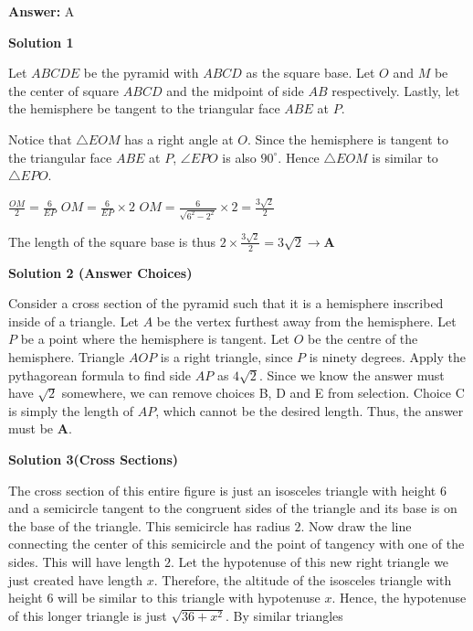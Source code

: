 \begin{enumerate}
 \textbf{Answer: }A



\textbf{Solution 1}

Let $ABCDE$ be the pyramid with $ABCD$ as the square base. Let $O$ and $M$ be the center of square $ABCD$ and the midpoint of side $AB$ respectively. Lastly, let the hemisphere be tangent to the triangular face $ABE$ at $P$.

 Notice that $\triangle EOM$ has a right angle at $O$. Since the hemisphere is tangent to the triangular face $ABE$ at $P$, $\angle EPO$ is also $90^{\circ}$. Hence $\triangle EOM$ is similar to $\triangle EPO$.

 $\frac{OM}{2} = \frac{6}{EP}$
$OM = \frac{6}{EP} \times 2$
$OM = \frac{6}{\sqrt{6^2 - 2^2}} \times 2 = \frac{3\sqrt{2}}{2}$

 The length of the square base is thus $2 \times \frac{3\sqrt{2}}{2} = 3\sqrt{2} \rightarrow \boxed{\textbf{A}}$




\textbf{Solution 2 (Answer Choices)}

Consider a cross section of the pyramid such that it is a hemisphere inscribed inside of a triangle. Let $A$ be the vertex furthest away from the hemisphere. Let $P$ be a point where the hemisphere is tangent. Let $O$ be the centre of the hemisphere. Triangle $AOP$ is a right triangle, since $P$ is ninety degrees. Apply the pythagorean formula to find side $AP$ as $4\sqrt{2}.$ Since we know the answer must have $\sqrt{2}$ somewhere, we can remove choices B, D and E from selection. Choice C is simply the length of $AP$, which cannot be the desired length. Thus, the answer must be $\boxed{\textbf{A}}$.

 



\textbf{Solution 3(Cross Sections)}

The cross section of this entire figure is just an isosceles triangle with height $6$ and a semicircle tangent to the congruent sides of the triangle and its base is on the base of the triangle. This semicircle has radius $2$. Now draw the line connecting the center of this semicircle and the point of tangency with one of the sides. This will have length $2$. Let the hypotenuse of this new right triangle we just created have length $x$. Therefore, the altitude of the isosceles triangle with height $6$ will be similar to this triangle with hypotenuse $x$. Hence, the hypotenuse of this longer triangle is just $\sqrt{36 + x^2}$. By similar triangles


\end{enumerate}
